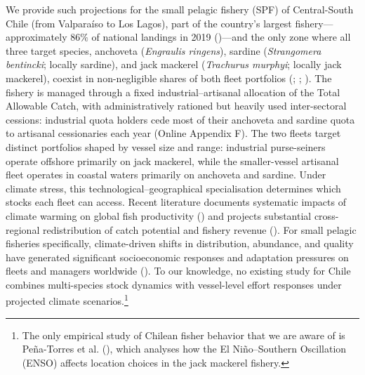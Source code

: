 \documentclass[
  11pt,
]{article}
\begin{document}
We provide such projections for the small pelagic fishery (SPF) of Central-South Chile (from Valparaíso to Los Lagos), part of the country's largest fishery---approximately \(86\%\) of national landings in 2019 ()---and the only zone where all three target species, anchoveta (\emph{Engraulis ringens}), sardine (\emph{Strangomera bentincki}; locally sardine), and jack mackerel (\emph{Trachurus murphyi}; locally jack mackerel), coexist in non-negligible shares of both fleet portfolios (; ; ). The fishery is managed through a fixed industrial--artisanal allocation of the Total Allowable Catch, with administratively rationed but heavily used inter-sectoral cessions: industrial quota holders cede most of their anchoveta and sardine quota to artisanal cessionaries each year (Online Appendix F). The two fleets target distinct portfolios shaped by vessel size and range: industrial purse-seiners operate offshore primarily on jack mackerel, while the smaller-vessel artisanal fleet operates in coastal waters primarily on anchoveta and sardine. Under climate stress, this technological--geographical specialisation determines which stocks each fleet can access. Recent literature documents systematic impacts of climate warming on global fish productivity () and projects substantial cross-regional redistribution of catch potential and fishery revenue (). For small pelagic fisheries specifically, climate-driven shifts in distribution, abundance, and quality have generated significant socioeconomic responses and adaptation pressures on fleets and managers worldwide (). To our knowledge, no existing study for Chile combines multi-species stock dynamics with vessel-level effort responses under projected climate scenarios.\footnote{The only empirical study of Chilean fisher behavior that we are aware of is Peña-Torres et al. (), which analyses how the El Niño--Southern Oscillation (ENSO) affects location choices in the jack mackerel fishery.}
\end{document}

